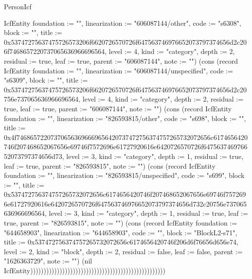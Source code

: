 \begin{lexlean}{PersonIcf}
\begin{semanticmodule}
{IcfEntity {foundation := "", linearization := "606087144/other", code := "s6308", block := "", title := 0x53747275637475726573206f6620726570726f647563746976652073797374656d2c206f7468657220737065636966696564, level := 4, kind := "category", depth := 2, residual := true, leaf := true, parent := "606087144", note := ""}) (cons (record IcfEntity {foundation := "", linearization := "606087144/unspecified", code := "s6309", block := "", title := 0x53747275637475726573206f6620726570726f647563746976652073797374656d2c20756e737065636966696564, level := 4, kind := "category", depth := 2, residual := true, leaf := true, parent := "606087144", note := ""}) (cons (record IcfEntity {foundation := "", linearization := "826593815/other", code := "s698", block := "", title := 0x4f746865722073706563696669656420737472756374757265732072656c6174656420746f207468652067656e69746f7572696e61727920616e6420726570726f647563746976652073797374656d73, level := 3, kind := "category", depth := 1, residual := true, leaf := true, parent := "826593815", note := ""}) (cons (record IcfEntity {foundation := "", linearization := "826593815/unspecified", code := "s699", block := "", title := 0x537472756374757265732072656c6174656420746f207468652067656e69746f7572696e61727920616e6420726570726f647563746976652073797374656d732c20756e737065636966696564, level := 3, kind := "category", depth := 1, residual := true, leaf := true, parent := "826593815", note := ""}) (cons (record IcfEntity {foundation := "644658903", linearization := "644658903", code := "", block := "BlockL2-s71", title := 0x537472756374757265732072656c6174656420746f206d6f76656d656e74, level := 2, kind := "block", depth := 2, residual := false, leaf := false, parent := "1626363729", note := ""}) (nil IcfEntity)))))))))))))))))))))))))))))))))))))))))))))))))))
}


\end{semanticmodule}
\end{lexlean}
